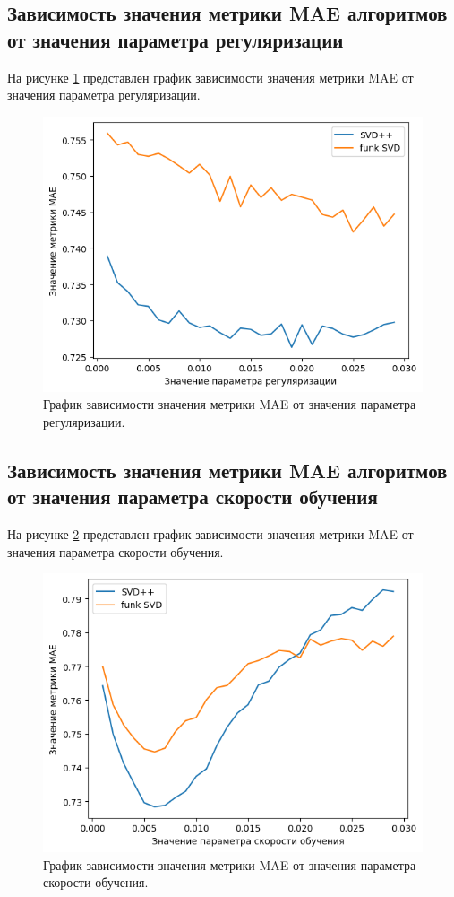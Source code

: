 \subsection{Зависимость значения метрики MAE алгоритмов от значения параметра регуляризации}

На рисунке \ref{img:time5} представлен график зависимости значения метрики MAE от значения параметра регуляризации.

\begin{figure}[H]
	\centering
	\includegraphics[width=\textwidth]{inc/maeReg.png}
	\caption{ График зависимости значения метрики MAE от значения параметра регуляризации.}
	\label{img:time5}
\end{figure}

\subsection{Зависимость значения метрики MAE алгоритмов от значения параметра скорости обучения}

На рисунке \ref{img:time6} представлен график зависимости значения метрики MAE от значения параметра скорости обучения.

\begin{figure}[H]
	\centering
	\includegraphics[width=\textwidth]{inc/maeLr.png}
	\caption{ График зависимости значения метрики MAE от значения параметра скорости обучения.}
	\label{img:time6}
\end{figure}

